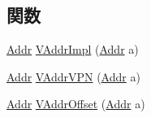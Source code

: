 \subsection*{関数}
\begin{DoxyCompactItemize}
\item 
\hyperlink{classm5_1_1params_1_1Addr}{Addr} \hyperlink{namespaceArmISA_ad22532ea07dba2e61c4a0e5f31831b13}{VAddrImpl} (\hyperlink{classm5_1_1params_1_1Addr}{Addr} a)
\item 
\hyperlink{classm5_1_1params_1_1Addr}{Addr} \hyperlink{namespaceArmISA_a5faed722f41c670ce3f4b0c95d8c10c5}{VAddrVPN} (\hyperlink{classm5_1_1params_1_1Addr}{Addr} a)
\item 
\hyperlink{classm5_1_1params_1_1Addr}{Addr} \hyperlink{namespaceArmISA_a0b4f98a8a9a38c145dabccb9eaabc12e}{VAddrOffset} (\hyperlink{classm5_1_1params_1_1Addr}{Addr} a)
\end{DoxyCompactItemize}
